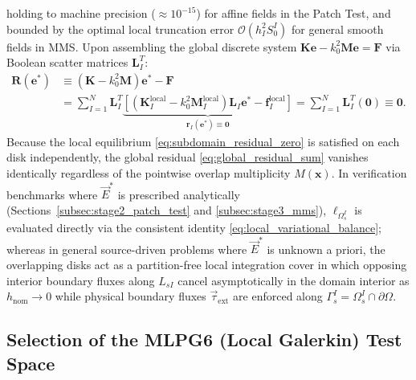 \documentclass[preprint,12pt]{elsarticle}
\begin{document}
holding to machine precision ($\approx 10^{-15}$) for affine fields in the Patch Test, and bounded by the optimal local truncation error $\mathcal{O}(h_I^2 S_0^I)$ for general smooth fields in MMS. Upon assembling the global discrete system $\mathbf{K}\mathbf{e} - k_0^2 \mathbf{M}\mathbf{e} = \mathbf{F}$ via Boolean scatter matrices $\mathbf{L}_I^T$:
\begin{equation}
    \begin{aligned}
        \mathbf{R}(\mathbf{e}^*) & \equiv (\mathbf{K} - k_0^2 \mathbf{M})\mathbf{e}^* - \mathbf{F} \\
                                 & = \sum_{I=1}^N \mathbf{L}_I^T \underbrace{\left[ (\mathbf{K}_I^{\mathrm{local}} - k_0^2 \mathbf{M}_I^{\mathrm{local}}) \mathbf{L}_I \mathbf{e}^* - \mathbf{f}_I^{\mathrm{local}} \right]}_{\mathbf{r}_I(\mathbf{e}^*) \equiv \mathbf{0}} = \sum_{I=1}^N \mathbf{L}_I^T (\mathbf{0}) \equiv \mathbf{0}.
    \end{aligned}
    \label{eq:global_residual_sum}
\end{equation}
Because the local equilibrium \eqref{eq:subdomain_residual_zero} is satisfied on each disk independently, the global residual \eqref{eq:global_residual_sum} vanishes identically regardless of the pointwise overlap multiplicity $M(\mathbf{x})$. In verification benchmarks where $\vec{E}^*$ is prescribed analytically (Sections~\ref{subsec:stage2_patch_test} and \ref{subsec:stage3_mms}), $\ell_{\Omega_s^I}$ is evaluated directly via the consistent identity \eqref{eq:local_variational_balance}; whereas in general source-driven problems where $\vec{E}^*$ is unknown a priori, the overlapping disks act as a partition-free local integration cover in which opposing interior boundary fluxes along $L_{sI}$ cancel asymptotically in the domain interior as $h_{\mathrm{nom}} \to 0$ while physical boundary fluxes $\vec{\tau}_{\mathrm{ext}}$ are enforced along $\Gamma_s^I = \Omega_s^I \cap \partial\Omega$.

\subsection{Selection of the MLPG6 (Local Galerkin) Test Space}
\label{subsec:mlpg6_selection}
\end{document}
